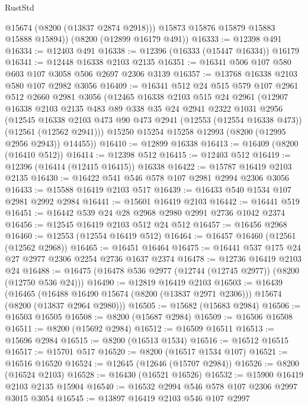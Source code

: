\begin{lexlean}{RustStd}
\begin{coremodule}
          @15674
          (@8200 (@13837 @2874 @2918)))
        @15873
        @15876
        @15879
        @15883
        @15888
        @15894))
    (@8200 (@12899 @16179 @491))
@16333 := @12398 @491
@16334 := @12403 @491
@16338 := @12396 (@16333 (@15447 @16334)) @16179
@16341 := @12448 @16338 @2103 @2135
@16351 := @16341 @506 @107 @580 @603 @107 @3058 @506 @2697 @2306 @3139
@16357 := @13768 @16338 @2103 @580 @107 @2982 @3056
@16409 := @16341
    @512
    @24
    @515
    @579
    @107
    @2961
    @512
    @2660
    @2981
    @3056
    (@12465
      @16338
      @2103
      @515
      @24
      @2961
      (@12907
        @16338
        @2103
        @2135
        @483
        @89
        @338
        @35
        @24
        @2941
        @2322
        @1031
        @2956
        (@12545
          @16338
          @2103
          @473
          @90
          @473
          @2941
          (@12553 (@12554 @16338 @473))
          (@12561 (@12562 @2941)))
        @15250
        @15254
        @15258
        @12993
        (@8200 (@12995 @2956 @2943))
        @14455))
@16410 := @12899 @16338
@16413 := @16409 (@8200 (@16410 @512))
@16414 := @12398 @512
@16415 := @12403 @512
@16419 := @12396 (@16414 (@12415 @16415)) @16338
@16422 := @15787 @16419 @2103 @2135
@16430 := @16422 @541 @546 @578 @107 @2981 @2994 @2306 @3056
@16433 := @15588 @16419 @2103 @517
@16439 := @16433 @540 @1534 @107 @2981 @2992 @2984
@16441 := @15601 @16419 @2103
@16442 := @16441 @519
@16451 := @16442 @539 @24 @28 @2968 @2980 @2991 @2736 @1042 @2374
@16456 := @12545 @16419 @2103 @512 @24 @512
@16457 := @16456 @2968
@16460 := @12553 (@12554 @16419 @512)
@16464 := @16457 @16460 (@12561 (@12562 @2968))
@16465 := @16451 @16464
@16475 := @16441 @537 @175 @24 @27 @2977 @2306 @2254 @2736 @1637 @2374
@16478 := @12736 @16419 @2103 @24
@16488 := @16475 (@16478 @536 @2977 (@12744 (@12745 @2977)) (@8200 (@12750 @536 @24)))
@16490 := @12819 @16419 @2103
@16503 := @16439
    (@16465 (@16488 @16490 @15674 (@8200 (@13837 @2971 @2306))) @15674 (@8200 (@13837 @2964 @2980)))
@16505 := @15682 (@15683 @2984)
@16506 := @16503 @16505
@16508 := @8200 (@15687 @2984)
@16509 := @16506 @16508
@16511 := @8200 (@15692 @2984)
@16512 := @16509 @16511
@16513 := @15696 @2984
@16515 := @8200 (@16513 @1534)
@16516 := @16512 @16515
@16517 := @15701 @517
@16520 := @8200 (@16517 @1534 @107)
@16521 := @16516 @16520
@16524 := @12645 (@12646 (@15707 @2984))
@16526 := @8200 (@16524 @2103)
@16528 := @16430 (@16521 @16526)
@16532 := @15900 @16419 @2103 @2135 @15904
@16540 := @16532 @2994 @546 @578 @107 @2306 @2997 @3015 @3054
@16545 := @13897 @16419 @2103 @546 @107 @2997

\end{coremodule}
\end{lexlean}
